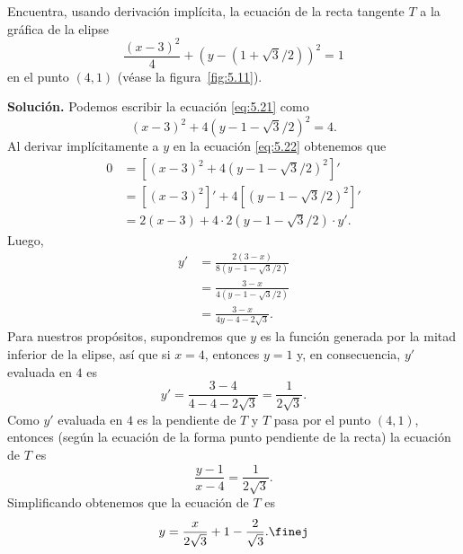 \documentclass[12pt,a4paper]{book}
\begin{document}
    \begin{ejemplo}\label{ejm:88}
        Encuentra, usando derivación implícita, la ecuación de la recta
        tangente $T$ a la gráfica de la elipse
        \begin{equation}\label{eq:5.21}
            \frac{(x-3)^{2}}{4}+\left(y-\left(1+\sqrt{3}/2\right)\right)^{2}=1
        \end{equation}
        en el punto $(4,1)$ (véase la figura~\ref{fig:5.11}).

        \textbf{Solución.} Podemos escribir la ecuación \eqref{eq:5.21} como
        \begin{equation}\label{eq:5.22}
            (x-3)^{2}+4\left(y-1-\sqrt{3}/2\right)^{2}=4.
        \end{equation}
        Al derivar implícitamente a $y$ en la ecuación \eqref{eq:5.22} obtenemos que
        \begin{align*}
            0&=\left[(x-3)^{2}+4\left(y-1-\sqrt{3}/2\right)^{2}\right]'\\
            &=\left[(x-3)^{2}\right]'+4\left[\left(y-1-\sqrt{3}/2\right)^{2}\right]'\\
            &=2(x-3)+4\cdot 2\left(y-1-\sqrt{3}/2\right)\cdot y'.
        \end{align*}
        Luego,
        \begin{align*}
            y'&=\frac{2(3-x)}{8\left(y-1-\sqrt{3}/2\right)}\\
            &=\frac{3-x}{4\left(y-1-\sqrt{3}/2\right)}\\
            &=\frac{3-x}{4y-4-2\sqrt{3}}.
        \end{align*}
        Para nuestros propósitos, supondremos que $y$ es la función generada por la
        mitad inferior de la elipse, así que si $x=4$, entonces $y=1$ y, en consecuencia,
        $y'$ evaluada en $4$ es
        \begin{equation*}
            y'=\frac{3-4}{4-4-2\sqrt{3}}=\frac{1}{2\sqrt{3}}.
        \end{equation*}
        Como $y'$ evaluada en $4$ es la pendiente de $T$ y $T$ pasa por el punto $(4,1)$,
        entonces (según la ecuación de la forma punto pendiente de la recta) la ecuación
        de $T$ es
        \begin{equation*}
            \frac{y-1}{x-4}=\frac{1}{2\sqrt{3}}.
        \end{equation*}
        Simplificando obtenemos que la ecuación de $T$ es
        \begin{equation*}
            y=\frac{x}{2\sqrt{3}}+1-\frac{2}{\sqrt{3}}.\finej
        \end{equation*}
    \end{ejemplo}
\end{document}
